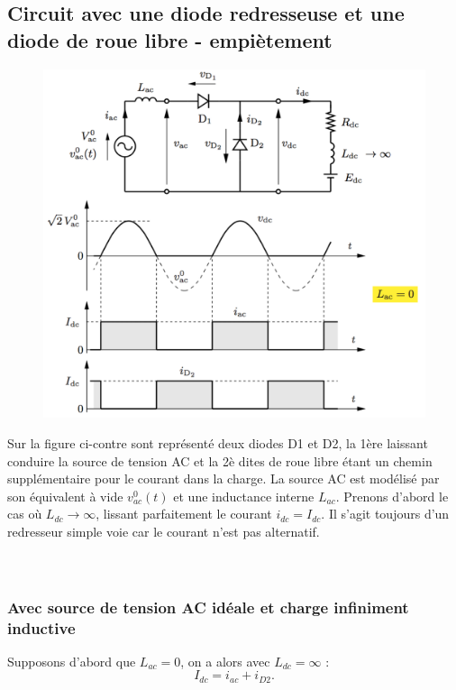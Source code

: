 	\subsection{Circuit avec une diode redresseuse et une diode de roue libre - empiètement}
		\begin{figure}
		\vspace{-5mm}
		\includegraphics[scale=0.3]{ch2/5}
		\end{figure}
		Sur la figure ci-contre sont représenté deux diodes D1 et D2, la 1ère laissant conduire la source de tension AC et la 2è dites de roue libre étant un chemin supplémentaire pour le courant dans la charge. La source AC est modélisé par son équivalent à vide $v_{ac}^0(t)$ et une inductance interne $L_{ac}$. Prenons d'abord le cas où $L_{dc} \rightarrow \infty$, lissant parfaitement le courant $i_{dc} = I_{dc}$. Il s'agit toujours d'un redresseur simple voie car le courant n'est pas alternatif. \\\\\\
		
		\subsubsection{Avec source de tension AC idéale et charge infiniment inductive}
			Supposons d'abord que $L_{ac} = 0$, on a alors avec $L_{dc} = \infty$ : 
			\begin{equation}
				I_{dc} = i_{ac} + i_{D2}.
			\end{equation}
			
